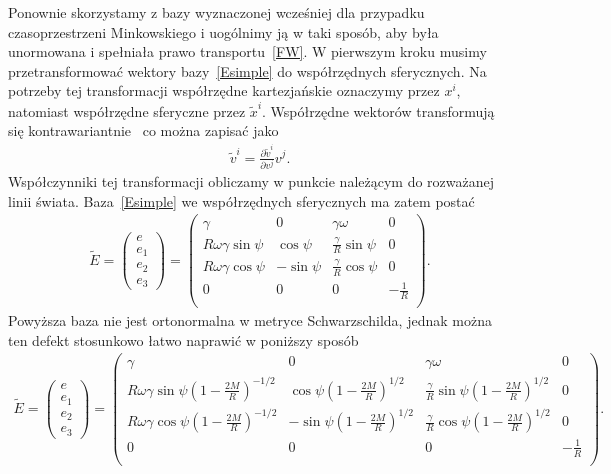 Ponownie skorzystamy z bazy wyznaczonej wcześniej dla przypadku
czasoprzestrzeni Minkowskiego i uogólnimy ją w taki sposób, 
aby była unormowana i spełniała prawo transportu~\eqref{FW}.
W pierwszym kroku musimy przetransformować wektory bazy~\eqref{Esimple}
do współrzędnych sferycznych.  Na potrzeby tej transformacji
współrzędne kartezjańskie oznaczymy przez $x^i$, natomiast współrzędne 
sferyczne przez $\tilde{x}^i$. Współrzędne wektorów transformują 
się kontrawariantnie~\cite{inga1980} co można zapisać jako
\begin{align}\nonumber
\tilde{v}^i = \frac{\partial \tilde{v}^i}{\partial v^j} v^j.
\end{align}
Współczynniki tej transformacji obliczamy w punkcie należącym do 
rozważanej linii świata. Baza~\eqref{Esimple} we współrzędnych sferycznych
ma zatem postać 
\begin{align}\nonumber
\widetilde{E}=
\begin{pmatrix}
e\\
e_1\\
e_2\\
e_3
\end{pmatrix}
=
\begin{pmatrix}
\gamma & 0 & \gamma \omega & 0 \\
R\omega\gamma \sin \psi & \cos\psi & \frac{\gamma}{R} \sin\psi & 0\\
R\omega\gamma \cos \psi & -\sin\psi & \frac{\gamma}{R} \cos\psi & 0\\
0 & 0 & 0 & -\frac{1}{R} \\
\end{pmatrix}.
\end{align}
Powyższa baza nie jest ortonormalna w metryce Schwarzschilda, jednak można 
ten defekt stosunkowo łatwo naprawić w poniższy sposób 
\begin{align}\nonumber
\widetilde{E}=
\begin{pmatrix}
e\\
e_1\\
e_2\\
e_3
\end{pmatrix}
=
\begin{pmatrix}
\gamma & 0 & \gamma \omega & 0 \\
R\omega\gamma \sin \psi \left(1-\frac{2 M}{R} \right)^{-1/2} 
& \cos\psi\left(1-\frac{2 M}{R} \right)^{1/2} 
& \frac{\gamma}{R} \sin\psi\left(1-\frac{2 M}{R} \right)^{1/2} & 0\\
R\omega\gamma \cos \psi\left(1-\frac{2 M}{R} \right)^{-1/2} 
& -\sin\psi \left(1-\frac{2 M}{R} \right)^{1/2}
& \frac{\gamma}{R} \cos\psi \left(1-\frac{2 M}{R} \right)^{1/2}& 0\\
0 & 0 & 0 & -\frac{1}{R} \\
\end{pmatrix}.
\end{align}
